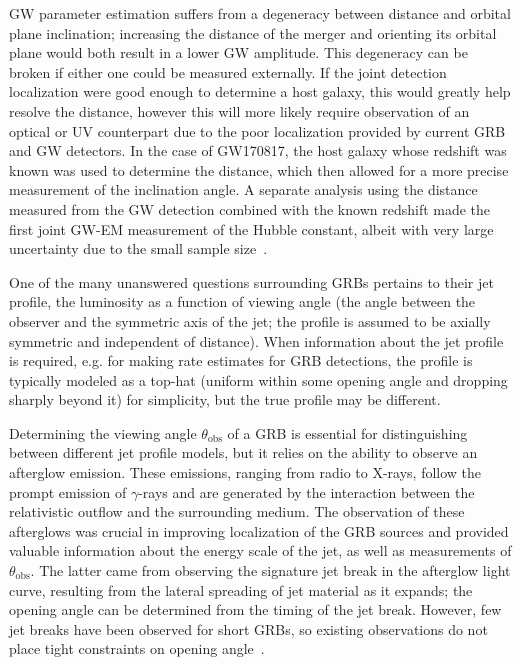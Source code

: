 \ac{GW} parameter estimation suffers from a degeneracy between distance and orbital plane inclination; increasing the distance of the merger and orienting its orbital plane would both result in a lower \ac{GW} amplitude.
This degeneracy can be broken if either one could be measured externally.
If the joint detection localization were good enough to determine a host galaxy, this would greatly help resolve the distance, however this will more likely require observation of an optical or UV counterpart due to the poor localization provided by current \ac{GRB} and \ac{GW} detectors.
In the case of GW170817, the host galaxy whose redshift was known was used to determine the distance, which then allowed for a more precise measurement of the inclination angle.
A separate analysis using the distance measured from the \ac{GW} detection combined with the known redshift made the first joint \ac{GW}-EM measurement of the Hubble constant, albeit with very large uncertainty due to the small sample size~\citep{gw170817_hubble}.

One of the many unanswered questions surrounding \acp{GRB} pertains to their jet profile, the luminosity as a function of viewing angle (the angle between the observer and the symmetric axis of the jet; the profile is assumed to be axially symmetric and independent of distance).
When information about the jet profile is required, e.g. for making rate estimates for \ac{GRB} detections, the profile is typically modeled as a top-hat (uniform within some opening angle and dropping sharply beyond it) for simplicity, but the true profile may be different.

Determining the viewing angle $\theta_{\mathrm{obs}}$ of a \ac{GRB} is essential for distinguishing between different jet profile models, but it relies on the ability to observe an afterglow emission.
These emissions, ranging from radio to X-rays, follow the prompt emission of $\gamma$-rays and are generated by the interaction between the relativistic outflow and the surrounding medium.
The observation of these afterglows was crucial in improving localization of the \ac{GRB} sources and provided valuable information about the energy scale of the jet, as well as measurements of $\theta_{\mathrm{obs}}$.
The latter came from observing the signature jet break in the afterglow light curve, resulting from the lateral spreading of jet material as it expands; the opening angle can be determined from the timing of the jet break.
However, few jet breaks have been observed for short \acp{GRB}, so existing observations do not place tight constraints on opening angle~\citep{Biscoveanu_2020}.

